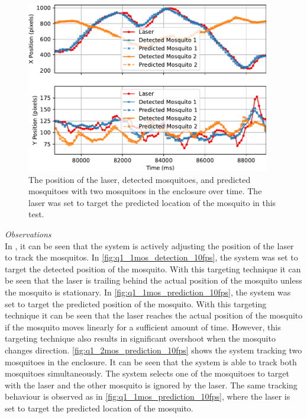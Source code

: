 \begin{figure}[!htb]
  \centering
  \includegraphics[width=0.95\textwidth]{figures/results/q1_2mos_prediction_10fps.pdf}
  \caption{The position of the laser, detected mosquitoes, and predicted mosquitoes with two mosquitoes in the enclosure over time. The laser was set to target the predicted location of the mosquito in this test.}
  \label{fig:q1_2mos_prediction_10fps}
\end{figure}

\textit{Observations}\\
In , it can be seen that the system is actively adjusting the position of the laser to track the mosquitos. In \autoref{fig:q1_1mos_detection_10fps}, the system was set to target the detected position of the mosquito. With this targeting technique it can be seen that the laser is trailing behind the actual position of the mosquito unless the mosquito is stationary. In \autoref{fig:q1_1mos_prediction_10fps}, the system was set to target the predicted position of the mosquito. With this targeting technique it can be seen that the laser reaches the actual position of the mosquito if the mosquito moves linearly for a sufficient amount of time. However, this targeting technique also results in significant overshoot when the mosquito changes direction. \autoref{fig:q1_2mos_prediction_10fps} shows the system tracking two mosquitoes in the enclosure. It can be seen that the system is able to track both mosquitoes simultaneously. The system selects one of the mosquitoes to target with the laser and the other mosquito is ignored by the laser. The same tracking behaviour is observed as in \autoref{fig:q1_1mos_prediction_10fps}, where the laser is set to target the predicted location of the mosquito.

